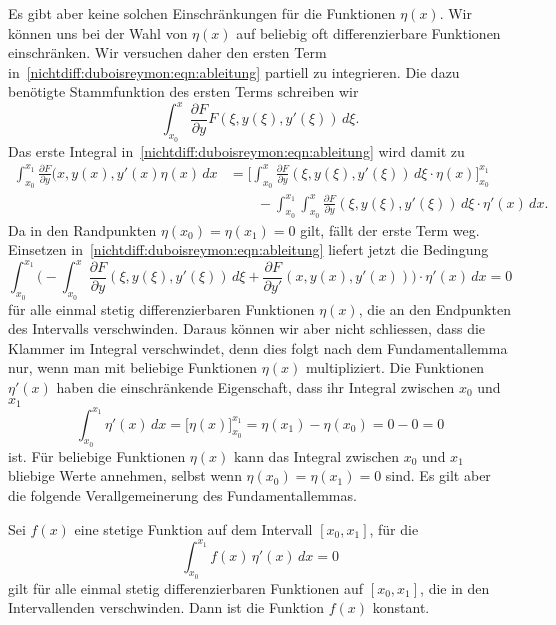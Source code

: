 Es gibt aber keine solchen Einschränkungen für die Funktionen $\eta(x)$.
Wir können uns bei der Wahl von $\eta(x)$ auf beliebig oft differenzierbare
Funktionen einschränken.
Wir versuchen daher den ersten Term
in~\eqref{nichtdiff:duboisreymon:eqn:ableitung}
partiell zu integrieren.
Die dazu benötigte Stammfunktion des ersten Terms schreiben wir
\[
\int_{x_0}^x \frac{\partial F}{\partial y}F(\xi, y(\xi), y'(\xi))\,d\xi.
\]
Das erste Integral in~\eqref{nichtdiff:duboisreymon:eqn:ableitung}
wird damit zu
\begin{align*}
\int_{x_0}^{x_1}
\frac{\partial F}{\partial y}(x,y(x),y'(x)\eta(x)\,dx
&=
\biggl[
\int_{x_0}^{x}
\frac{\partial F}{\partial y}(\xi,y(\xi),y'(\xi))
\,d\xi
\cdot 
\eta(x)
\biggr]_{x_0}^{x_1}
\\
&\qquad
-
\int_{x_0}^{x_1}
\int_{x_0}^{x}
\frac{\partial F}{\partial y}(\xi,y(\xi),y'(\xi))
\,d\xi
\cdot\eta'(x)
\,dx.
\end{align*}
Da in den Randpunkten $\eta(x_0)=\eta(x_1)=0$ gilt, 
fällt der erste Term weg.
Einsetzen in~\eqref{nichtdiff:duboisreymon:eqn:ableitung}
liefert jetzt die Bedingung
\begin{equation}
\int_{x_0}^{x_1}
\biggl(
-\int_{x_0}^x\frac{\partial F}{\partial y}(\xi, y(\xi),y'(\xi))
\,d\xi
+
\frac{\partial F}{\partial y'}(x,y(x),y'(x))
\biggr)
\cdot
\eta'(x)\,dx
=
0
\label{buch:nichtdiff:duboisreymond:eqn:integralgleichung}
\end{equation}
für alle einmal stetig differenzierbaren Funktionen $\eta(x)$, die
an den Endpunkten des Intervalls verschwinden.
Daraus können wir aber nicht schliessen, dass die Klammer im
Integral verschwindet, denn dies folgt nach dem Fundamentallemma
nur, wenn man mit beliebige Funktionen $\eta(x)$ multipliziert.
Die Funktionen $\eta'(x)$ haben die einschränkende Eigenschaft,
dass ihr Integral zwischen $x_0$ und $x_1$
\[
\int_{x_0}^{x_1}
\eta'(x)\,dx
=
\biggl[
\eta(x)
\biggr]_{x_0}^{x_1}
=
\eta(x_1) - \eta(x_0)
=
0-0
=
0
\]
ist.
Für beliebige Funktionen $\eta(x)$ kann das Integral zwischen $x_0$
und $x_1$ bliebige Werte annehmen, selbst wenn $\eta(x_0)=\eta(x_1)=0$
sind.
Es gilt aber die folgende Verallgemeinerung des Fundamentallemmas.

\begin{lemma}
\label{buch:nichtdiff:duboisreymond:lemma:duboisreymond}
Sei $f(x)$ eine stetige Funktion auf dem Intervall $[x_0,x_1]$, für die
\[
\int_{x_0}^{x_1}
f(x)\,\eta'(x)\,dx
=
0
\]
gilt für alle einmal stetig differenzierbaren Funktionen auf $[x_0,x_1]$,
die in den Intervallenden verschwinden.
Dann ist die Funktion $f(x)$ konstant.
\end{lemma}

